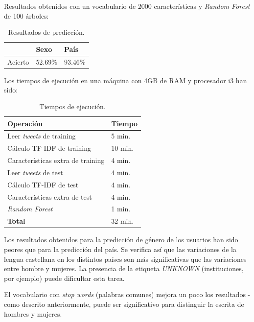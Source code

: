 \documentclass[11pt,a4paper]{article}
\begin{document}
  Resultados obtenidos con un vocabulario de 2000 caracter\'isticas y {\em Random Forest} de 100 \'arboles:
  \begin{table}[h]
    \begin{center}
	\begin{tabular}{ | l | l | l | }
             \hline & \bf Sexo  & \bf Pa\'is\\ \hline
	  Acierto & 52.69\% & 93.46\% \\
	  \hline 
	\end{tabular}
    \end{center}
    \caption{\label{results-table} Resultados de predicci\'on. }
  \end{table}
    
  Los tiempos de ejecuci\'on en una m\'aquina con 4GB de RAM y procesador i3 han sido:
  \begin{table}[h]
    \begin{center}
	\begin{tabular}{ | l | l | }
	  \hline \bf Operaci\'on & \bf Tiempo\\ \hline
	  Leer {\em tweets} de training & 5 min. \\
	  C\'alculo TF-IDF de training & 10 min. \\
	  Caracter\'isticas extra de training & 4 min. \\
	  Leer {\em tweets} de test & 4 min. \\
	  C\'alculo TF-IDF de test & 4 min. \\
	  Caracter\'isticas extra de test & 4 min. \\
	  {\em Random Forest} & 1 min. \\ \hline
	  \bf Total & 32 min. \\ \hline
	\end{tabular}
    \end{center}
    \caption{\label{times-table} Tiempos de ejecuci\'on. }
  \end{table}  
  
  Los resultados obtenidos para la predicci\'on de g\'enero de los usuarios han sido peores que para la predicci\'on del pa\'is. Se verifica as\'i que las variaciones de la lengua castellana en los distintos pa\'ises son m\'as significativas que las variaciones entre hombre y mujeres. La presencia de la etiqueta {\em UNKNOWN} (instituciones, por ejemplo) puede dificultar esta tarea. 

  El vocabulario con {\em stop words} (palabras comunes) mejora un poco los resultados - como descrito anteriormente, puede ser significativo para distinguir la escrita de hombres y mujeres. 
\end{document}
